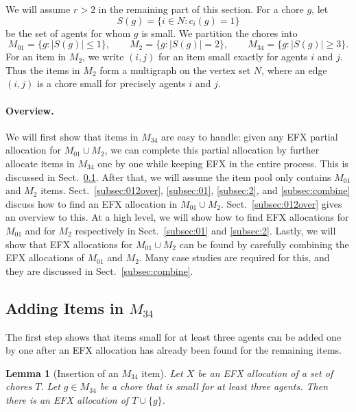 \documentclass{article}
\newtheorem{lemma}{Lemma}
\theoremstyle{definition}
\begin{document}
We will assume $r>2$ in the remaining part of this section.
For a chore $g$, let
\[
 S(g)=\{i\in N:c_i(g)=1\}
\]
be the set of agents for whom $g$ is small.  We partition the chores into
\[
M_{01}=\{g:|S(g)|\le 1\},\qquad
M_2=\{g:|S(g)|=2\},\qquad
M_{34}=\{g:|S(g)|\ge 3\}.
\]
For an item in $M_2$, we write $(i,j)$ for an item small exactly for agents
$i$ and $j$.  Thus the items in $M_2$ form a multigraph on the vertex set
$N$, where an edge $(i,j)$ is a chore small for precisely agents $i$ and $j$.

\paragraph{Overview.}
We will first show that items in $M_{34}$ are easy to handle: given any EFX partial allocation for $M_{01}\cup M_2$, we can complete this partial allocation by further allocate items in $M_{34}$ one by one while keeping EFX in the entire process.
This is discussed in Sect.~\ref{subsec:34}.
After that, we will assume the item pool only contains $M_{01}$ and $M_{2}$ items.
Sect.~\ref{subsec:012over}, \ref{subsec:01}, \ref{subsec:2}, and \ref{subsec:combine} discuss how to find an EFX allocation in $M_{01}\cup M_2$.
Sect.~\ref{subsec:012over} gives an overview to this.
At a high level, we will show how to find EFX allocations for $M_{01}$ and for $M_2$ respectively in Sect.~\ref{subsec:01} and \ref{subsec:2}.
Lastly, we will show that EFX allocations for $M_{01}\cup M_2$ can be found by carefully combining the EFX allocations of $M_{01}$ and $M_2$.
Many case studies are required for this, and they are discussed in Sect.~\ref{subsec:combine}.


\subsection{Adding Items in $M_{34}$}
\label{subsec:34}
The first step shows that items small for at least three agents can be added
one by one after an EFX allocation has already been found for the remaining
items.

\begin{lemma}[Insertion of an $M_{34}$ item]\label{lem:insertion}
Let $X$ be an EFX allocation of a set of chores $T$.  Let $g\in M_{34}$ be a
chore that is small for at least three agents.  Then there is an EFX
allocation of $T\cup\{g\}$.
\end{lemma}
\end{document}
